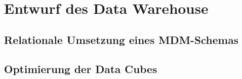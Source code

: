 \section{Entwurf des Data Warehouse}
\subsection{Relationale Umsetzung eines MDM-Schemas}
\subsection{Optimierung der Data Cubes}